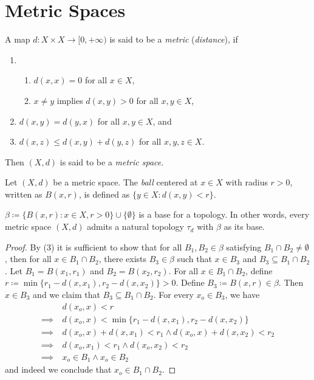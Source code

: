 \documentclass{techreport}
\begin{document}
\section{Metric Spaces}

\begin{definition}\label{De:Metrics}
	A map $d : X \times X \to [0,+\infty)$ is said to be a \emph{metric} (\emph{distance}), if
	\begin{enumerate}
		\item 
		\begin{enumerate}
			\item $d(x,x) = 0$ for all $x \in X$,
			\item $x \neq y$ implies $d(x,y) > 0$ for all $x,y \in X$,
		\end{enumerate}
		\item $d(x,y) = d(y,x)$ for all $x,y \in X$, and
		\item $d(x,z) \le d(x,y) + d(y,z)$ for all $x,y,z \in X$.
	\end{enumerate}
	Then $(X,d)$ is said to be a \emph{metric space}.
\end{definition}

\begin{definition}\label{De:OpenBalls}
	Let $(X,d)$ be a metric space.
	The \emph{ball} centered at $x \in X$ with radius $r > 0$, written as $B(x,r)$, is defined as $\{ y \in X : d(x,y) < r\}$.
\end{definition}

\begin{lemma}\label{Lem:MetricInduceTop}
	$\beta \coloneqq \{ B(x,r) : x \in X, r > 0 \} \cup \{ \emptyset \}$ is a base for a topology.
	In other words, every metric space $(X,d)$ admits a natural topology $\tau_d$ with $\beta$ as its base.
\end{lemma}
\begin{proof}
	By (3) it is sufficient to show that for all $B_1,B_2 \in \beta$ satisfying $B_1 \cap B_2 \neq \emptyset$, then for all $x \in B_1 \cap B_2$, there exists $B_3 \in \beta$ such that $x \in B_3$ and $B_3 \subseteq B_1 \cap B_2$.
	Let $B_1 = B(x_1,r_1)$ and $B_2 = B(x_2,r_2)$.
	For all $x \in B_1 \cap B_2$, define $r \coloneqq \min \{ r_1 - d(x,x_1), r_2 - d(x,x_2) \} > 0$.
	Define $B_3 \coloneqq B(x,r) \in \beta$.
	Then $x \in B_3$ and we claim that $B_3 \subseteq B_1 \cap B_2$.
	For every $x_o \in B_3$, we have
	\begin{align*}
		& d(x_o,x) < r \\
		\implies~ & d(x_o,x) < \min \{ r_1 - d(x,x_1), r_2 - d(x,x_2) \} \\
		\implies~ & d(x_o,x) + d(x,x_1) < r_1 \wedge d(x_o,x)+d(x,x_2) < r_2 \\
		\implies~ & d(x_o,x_1) < r_1 \wedge d(x_o,x_2) < r_2 \\
		\implies~ & x_o \in B_1 \wedge x_o \in B_2
	\end{align*}
	and indeed we conclude that $x_o \in B_1 \cap B_2$.
\end{proof}
\end{document}
